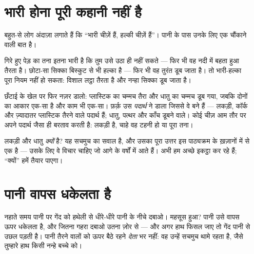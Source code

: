 \section{भारी होना पूरी कहानी नहीं है}

बहुत-से लोग अंदाज़ा लगाते हैं कि ``भारी चीज़ें  हैं, हल्की चीज़ें
 हैं''। पानी के पास उनके लिए एक चौंकाने वाली बात है।

\begin{example}[लट्ठा और सिक्का]\label{ex:g1:floating-and-sinking:log}
गिरे हुए पेड़ का तना इतना भारी है कि तुम उसे उठा ही नहीं सकते ---
फिर भी वह नदी में बहता हुआ तैरता है। छोटा-सा सिक्का बिस्कुट से भी
हल्का है --- फिर भी वह तुरंत डूब जाता है। तो भारी-हल्का पूरा नियम
नहीं हो सकता: विशाल लट्ठा तैरता है और नन्हा सिक्का डूब जाता है।
\end{example}

\begin{example}[असली बात पदार्थ की है]\label{ex:g1:floating-and-sinking:stuff}
छँटाई के खेल पर फिर नज़र डालो: प्लास्टिक का चम्मच तैरा और धातु का
चम्मच डूब गया, जबकि दोनों का आकार एक-सा है और काम भी एक-सा। फ़र्क़
उस \emph{पदार्थ} ने डाला जिससे वे बने हैं --- लकड़ी, कॉर्क और
ज़्यादातर प्लास्टिक तैरने वाले पदार्थ हैं; धातु, पत्थर और काँच डूबने
वाले। कोई चीज़ आम तौर पर अपने पदार्थ जैसा ही बरताव करती है: लकड़ी
 है, चाहे वह टहनी हो या पूरा तना।
\end{example}

\begin{remark}[थोड़ा-सा रहस्य]\label{rem:g1:floating-and-sinking:why}
लकड़ी  और धातु  \emph{क्यों} है? यह सचमुच का सवाल है, और
उसका पूरा उत्तर इस पाठ्यक्रम के ख़ज़ानों में से एक है --- उसके लिए वे
विचार चाहिए जो आगे के वर्षों में आते हैं। अभी हम अच्छे 
इकट्ठा कर रहे हैं; ``क्यों'' हमें तैयार पाएगा।
\end{remark}

\section{पानी वापस धकेलता है}

\begin{example}[इसे करके देखो: गेंद को नीचे दबाओ]\label{ex:g1:floating-and-sinking:push}
नहाते समय पानी पर  गेंद को हथेली से धीरे-धीरे पानी के नीचे
दबाओ। महसूस हुआ? पानी उसे वापस ऊपर धकेलता है, और जितना गहरा दबाओ
उतना ज़ोर से --- और अगर हाथ फिसल जाए तो गेंद पानी से उछल पड़ती है।
पानी तैरने वालों को ऊपर बैठे रहने \emph{देता} भर नहीं: वह उन्हें
सचमुच थामे रहता है, जैसे तुम्हारे हाथ किसी नन्हे बच्चे को।
\end{example}

